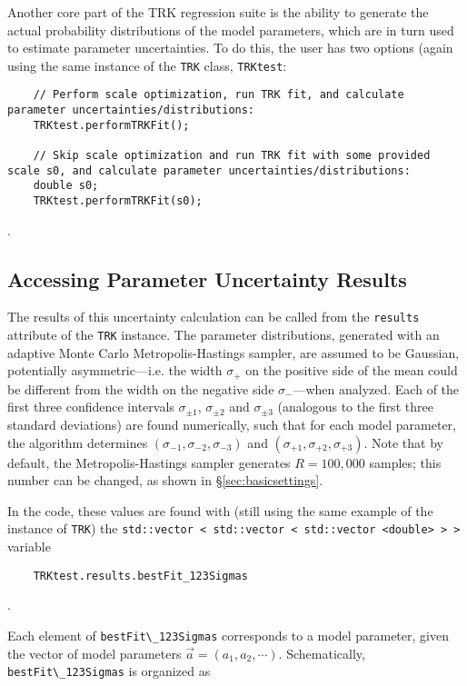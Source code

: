 \documentclass[12pt]{article}
\newcommand{\li}{\lstinline}
\begin{document}
Another core part of the TRK regression suite is the ability to generate the actual probability distributions of the model parameters, which are in turn used to estimate parameter uncertainties. To do this, the user has two options (again using the same instance of the \li{TRK} class, \li{TRKtest}:

\begin{lstlisting}
    // Perform scale optimization, run TRK fit, and calculate parameter uncertainties/distributions:
    TRKtest.performTRKFit();
    
    // Skip scale optimization and run TRK fit with some provided scale s0, and calculate parameter uncertainties/distributions:
    double s0;
    TRKtest.performTRKFit(s0);
\end{lstlisting}.

\subsection{Accessing Parameter Uncertainty Results}
The results of this uncertainty calculation can be called from the \li{results} attribute of the \li{TRK} instance. The parameter distributions, generated with an adaptive Monte Carlo Metropolis-Hastings sampler, are assumed to be Gaussian, potentially asymmetric---i.e. the width $\sigma_+$ on the positive side of the mean could be different from the width on the negative side $\sigma_-$---when analyzed. Each of the first three confidence intervals $\sigma_{\pm1}$, $\sigma_{\pm2}$ and $\sigma_{\pm3}$ (analogous to the first three standard deviations) are found numerically, such that for each model parameter, the algorithm determines $(\sigma_{-1}, \sigma_{-2}, \sigma_{-3})$ and $(\sigma_{+1}, \sigma_{+2}, \sigma_{+3})$. Note that by default, the Metropolis-Hastings sampler generates $R=100,000$ samples; this number can be changed, as shown in \S\ref{sec:basicsettings}. 

In the code, these values are found with (still using the same example of the instance of \li{TRK}) the \li{std::vector < std::vector < std::vector <double> > >} variable

\begin{lstlisting}
    TRKtest.results.bestFit_123Sigmas
\end{lstlisting}.

Each element of \li{bestFit\_123Sigmas} corresponds to a model parameter, given the vector of model parameters $\vec{a}=(a_1,a_2,\cdots)$. Schematically, \li{bestFit\_123Sigmas} is organized as 
\end{document}
